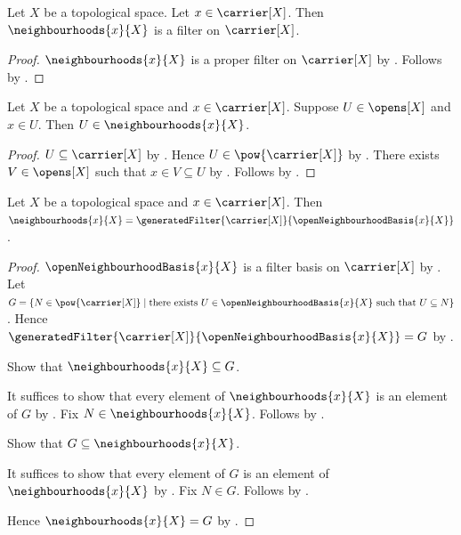 \begin{classification}\label{neighbourhoods_is_filter}
    Let $X$ be a topological space.
    Let $x\in\carrier[X]$.
    Then $\neighbourhoods{x}{X}$ is a filter on $\carrier[X]$.
\end{classification}
\begin{proof}
    $\neighbourhoods{x}{X}$ is a proper filter on $\carrier[X]$
        by .
    Follows by .
\end{proof}

\begin{proposition}\label{open_set_containing_point_is_neighbourhood}
    Let $X$ be a topological space and $x\in\carrier[X]$.
    Suppose $U\in\opens[X]$ and $x\in U$.
    Then $U\in\neighbourhoods{x}{X}$.
\end{proposition}
\begin{proof}
    $U\subseteq\carrier[X]$ by .
    Hence $U\in\pow{\carrier[X]}$ by .
    There exists $V\in\opens[X]$ such that $x\in V\subseteq U$ by
        .
    Follows by .
\end{proof}

\begin{theorem}\label{neighbourhood_filter_is_generated_by_open_neighbourhoods}
    Let $X$ be a topological space and $x\in\carrier[X]$.
    Then
        $\neighbourhoods{x}{X}
            =\generatedFilter{\carrier[X]}{\openNeighbourhoodBasis{x}{X}}$.
\end{theorem}
\begin{proof}
    $\openNeighbourhoodBasis{x}{X}$ is a filter basis on $\carrier[X]$
        by .
    Let $G=\{N\in\pow{\carrier[X]}\mid
        \text{there exists $U\in\openNeighbourhoodBasis{x}{X}$
            such that $U\subseteq N$}\}$.
    Hence
        $\generatedFilter{\carrier[X]}{\openNeighbourhoodBasis{x}{X}}
            =G$ by
        .

    Show that $\neighbourhoods{x}{X}\subseteq G$.
    \begin{subproof}
        It suffices to show that every element of $\neighbourhoods{x}{X}$
            is an element of $G$ by .
        Fix $N\in\neighbourhoods{x}{X}$.
        Follows by .
    \end{subproof}
    Show that $G\subseteq\neighbourhoods{x}{X}$.
    \begin{subproof}
        It suffices to show that every element of $G$ is an element of
            $\neighbourhoods{x}{X}$ by .
        Fix $N\in G$.
        Follows by .
    \end{subproof}
    Hence $\neighbourhoods{x}{X}=G$ by .
\end{proof}

